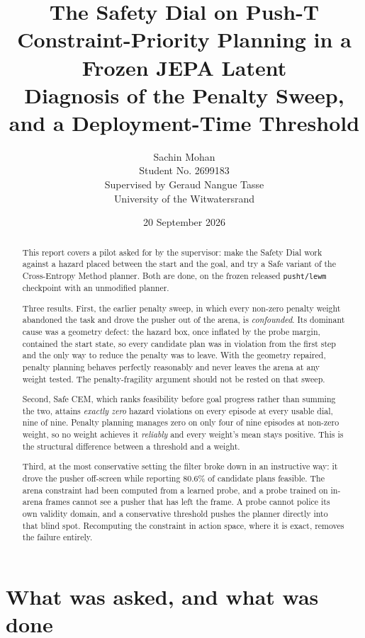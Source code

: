 \documentclass[11pt,a4paper]{article}
\title{The Safety Dial on Push-T\\[0.5em]
  \large Constraint-Priority Planning in a Frozen JEPA Latent\\[0.3em]
  \large Diagnosis of the Penalty Sweep, and a Deployment-Time Threshold}
\author{Sachin Mohan \\ Student No. 2699183 \\
  Supervised by Geraud Nangue Tasse \\ University of the Witwatersrand}
\date{20 September 2026}
\begin{document}
\maketitle

\begin{abstract}
This report covers a pilot asked for by the supervisor: make the Safety Dial work against a
hazard placed between the start and the goal, and try a Safe variant of the Cross-Entropy
Method planner. Both are done, on the frozen released \texttt{pusht/lewm} checkpoint with an
unmodified planner.

Three results. First, the earlier penalty sweep, in which every non-zero penalty weight
abandoned the task and drove the pusher out of the arena, is \emph{confounded}. Its dominant
cause was a geometry defect: the hazard box, once inflated by the probe margin, contained the
start state, so every candidate plan was in violation from the first step and the only way to
reduce the penalty was to leave. With the geometry repaired, penalty planning behaves
perfectly reasonably and never leaves the arena at any weight tested. The penalty-fragility
argument should not be rested on that sweep.

Second, Safe CEM, which ranks feasibility before goal progress rather than summing the two,
attains \emph{exactly zero} hazard violations on every episode at every usable dial, nine of
nine. Penalty planning manages zero on only four of nine episodes at non-zero weight, so no
weight achieves it \emph{reliably} and every weight's mean stays positive. This is the
structural difference between a threshold and a weight.

Third, at the most conservative setting the filter broke down in an instructive way: it drove
the pusher off-screen while reporting $80.6\%$ of candidate plans feasible. The arena
constraint had been computed from a learned probe, and a probe trained on in-arena frames
cannot see a pusher that has left the frame. A probe cannot police its own validity domain,
and a conservative threshold pushes the planner directly into that blind spot. Recomputing the
constraint in action space, where it is exact, removes the failure entirely.
\end{abstract}

\tableofcontents

\section{What was asked, and what was done}
\end{document}

